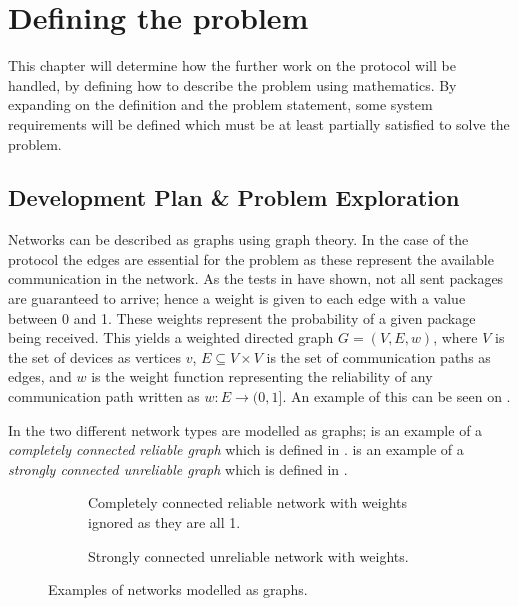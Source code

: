 \chapter{Defining the problem}
This chapter will determine how the further work on the protocol will be handled, by defining how to describe the problem using mathematics. 
By expanding on the definition and the problem statement, some system requirements will be defined which must be at least partially satisfied to solve the problem.

\section{Development Plan \& Problem Exploration}\label{chp:Problems}
Networks can be described as graphs using graph theory. 
In the case of the protocol the edges are essential for the problem as these represent the available communication in the network.
As the tests in  have shown, not all sent packages are guaranteed to arrive; hence a weight is given to each edge with a value between 0 and 1.
These weights represent the probability of a given package being received.
This yields a weighted directed graph $G = (V, E, w)$, where $V$ is the set of devices as vertices $v$, $E \subseteq V \times V$ is the set of communication paths as edges, and $w$ is the weight function representing the reliability of any communication path written as $w : E \rightarrow (0,1]$. 
An example of this can be seen on .

In  the two different network types are modelled as graphs; 
 is an example of a \emph{completely connected reliable graph} which is defined in .
 is an example of a \emph{strongly connected unreliable graph} which is defined in .

\begin{figure}[H]
    \footnotesize
    \begin{subfigure}{0.47\linewidth}
        \centering
        
        \caption{Completely connected reliable network with weights ignored as they are all 1.}
        \label{fig:ccrcnetworkgraph}
    \end{subfigure}\hfill
    \begin{subfigure}{0.47\linewidth}
        \centering
        
        \caption{Strongly connected unreliable network with weights.}
        \label{fig:network}
    \end{subfigure}
    \caption{Examples of networks modelled as graphs.}
    \label{fig:examplenetworkgraphs}
    \vspace{-20pt}
\end{figure}

